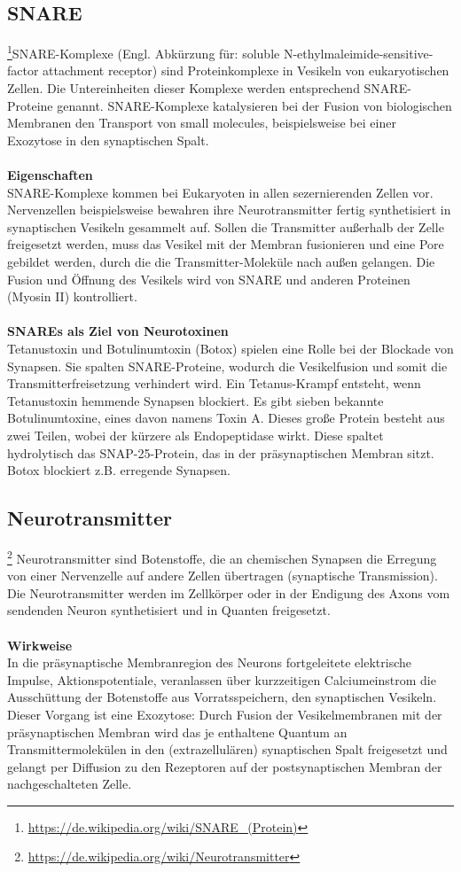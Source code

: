 \subsection{SNARE}\footnote{\url{https://de.wikipedia.org/wiki/SNARE_(Protein)}}SNARE-Komplexe (Engl. Abkürzung für: soluble N-ethylmaleimide-sensitive-factor attachment receptor) sind Proteinkomplexe in Vesikeln von eukaryotischen Zellen. Die Untereinheiten dieser Komplexe werden entsprechend SNARE-Proteine genannt. SNARE-Komplexe katalysieren bei der Fusion von biologischen Membranen den Transport von small molecules, beispielsweise bei einer Exozytose in den synaptischen Spalt.
\\\\
\textbf{Eigenschaften}\\
SNARE-Komplexe kommen bei Eukaryoten in allen sezernierenden Zellen vor. Nervenzellen beispielsweise bewahren ihre Neurotransmitter fertig synthetisiert in synaptischen Vesikeln gesammelt auf. Sollen die Transmitter außerhalb der Zelle freigesetzt werden, muss das Vesikel mit der Membran fusionieren und eine Pore gebildet werden, durch die die Transmitter-Moleküle nach außen gelangen. Die Fusion und Öffnung des Vesikels wird von SNARE und anderen Proteinen (Myosin II) kontrolliert.
\\\\
\textbf{SNAREs als Ziel von Neurotoxinen}\\
Tetanustoxin und Botulinumtoxin (Botox) spielen eine Rolle bei der Blockade von Synapsen. Sie spalten SNARE-Proteine, wodurch die Vesikelfusion und somit die Transmitterfreisetzung verhindert wird. Ein Tetanus-Krampf entsteht, wenn Tetanustoxin hemmende Synapsen blockiert. Es gibt sieben bekannte Botulinumtoxine, eines davon namens Toxin A. Dieses große Protein besteht aus zwei Teilen, wobei der kürzere als Endopeptidase wirkt. Diese spaltet hydrolytisch das SNAP-25-Protein, das in der präsynaptischen Membran sitzt. Botox blockiert z.B. erregende Synapsen.

\subsection{Neurotransmitter}\footnote{\url{https://de.wikipedia.org/wiki/Neurotransmitter}} Neurotransmitter sind Botenstoffe, die an chemischen Synapsen die Erregung von einer Nervenzelle auf andere Zellen übertragen (synaptische Transmission).
Die Neurotransmitter werden im Zellkörper oder in der Endigung des Axons vom sendenden Neuron synthetisiert und in Quanten freigesetzt.
\\\\
\textbf{Wirkweise}\\
In die präsynaptische Membranregion des Neurons fortgeleitete elektrische Impulse, Aktionspotentiale, veranlassen über kurzzeitigen Calciumeinstrom die Ausschüttung der Botenstoffe aus Vorratsspeichern, den synaptischen Vesikeln. Dieser Vorgang ist eine Exozytose: Durch Fusion der Vesikelmembranen mit der präsynaptischen Membran wird das je enthaltene Quantum an Transmittermolekülen in den (extrazellulären) synaptischen Spalt freigesetzt und gelangt per Diffusion zu den Rezeptoren auf der postsynaptischen Membran der nachgeschalteten Zelle.

